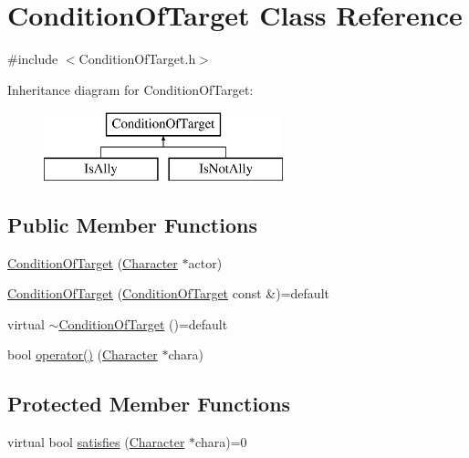 \hypertarget{class_condition_of_target}{}\section{Condition\+Of\+Target Class Reference}
\label{class_condition_of_target}


{\ttfamily \#include $<$Condition\+Of\+Target.\+h$>$}

Inheritance diagram for Condition\+Of\+Target\+:\begin{figure}[H]
\begin{center}
\leavevmode
\includegraphics[height=2.000000cm]{class_condition_of_target}
\end{center}
\end{figure}
\subsection*{Public Member Functions}
\begin{DoxyCompactItemize}
\item 
\hyperlink{class_condition_of_target_a88ac45fb30fa4badcaa05d498eaefb6e}{Condition\+Of\+Target} (\hyperlink{class_character}{Character} $\ast$actor)
\item 
\hyperlink{class_condition_of_target_a12ba88773efe3e38b49768fb8241c2e1}{Condition\+Of\+Target} (\hyperlink{class_condition_of_target}{Condition\+Of\+Target} const \&)=default
\item 
virtual \hyperlink{class_condition_of_target_acb8515e760920f9fbbe8cd8a0a514c3e}{$\sim$\+Condition\+Of\+Target} ()=default
\item 
bool \hyperlink{class_condition_of_target_acb7a4ec40ad051b3d9faf12f764cab95}{operator()} (\hyperlink{class_character}{Character} $\ast$chara)
\end{DoxyCompactItemize}
\subsection*{Protected Member Functions}
\begin{DoxyCompactItemize}
\item 
virtual bool \hyperlink{class_condition_of_target_a74d0f2d1449d798bd1ea410c9472a807}{satisfies} (\hyperlink{class_character}{Character} $\ast$chara)=0
\end{DoxyCompactItemize}
